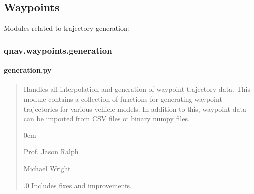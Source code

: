 \documentclass[letterpaper,10pt,english]{sphinxmanual}
\begin{document}
\subsection{Waypoints}
\label{\detokenize{usage/packages:waypoints}}
\sphinxAtStartPar
Modules related to trajectory generation:

\sphinxstepscope


\subsubsection{qnav.waypoints.generation}
\label{\detokenize{modules/waypoints/generation:module-qnav.waypoints.generation}}\label{\detokenize{modules/waypoints/generation:qnav-waypoints-generation}}\label{\detokenize{modules/waypoints/generation::doc}}

\paragraph{generation.py}
\label{\detokenize{modules/waypoints/generation:generation-py}}\begin{quote}\begin{description}
\sphinxAtStartPar
Handles all interpolation and generation of waypoint trajectory data.
This module contains a collection of functions for generating waypoint
trajectories for various vehicle models. In addition to this, waypoint
data can be imported from CSV files or binary numpy files.

\begin{DUlineblock}{0em}
\item[] Prof. Jason Ralph \sphinxhyphen{} 
\item[] Michael Wright \sphinxhyphen{} 
\end{DUlineblock}

.0 \sphinxhyphen{} Includes fixes and improvements.

\end{description}\end{quote}
\end{document}
